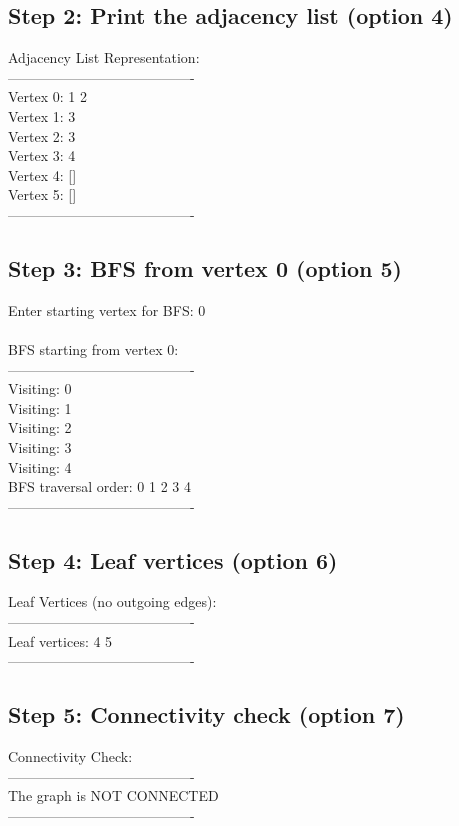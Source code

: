 \documentclass[11pt]{article}
\begin{document}
\subsection*{Step 2: Print the adjacency list (option 4)}
\begin{terminal}
Adjacency List Representation:\\
----------------------------------------\\
Vertex 0: 1 2\\
Vertex 1: 3\\
Vertex 2: 3\\
Vertex 3: 4\\
Vertex 4: []\\
Vertex 5: []\\
----------------------------------------
\end{terminal}

\subsection*{Step 3: BFS from vertex 0 (option 5)}
\begin{terminal}
Enter starting vertex for BFS: 0\\
\ \\
BFS starting from vertex 0:\\
----------------------------------------\\
Visiting: 0\\
Visiting: 1\\
Visiting: 2\\
Visiting: 3\\
Visiting: 4\\
BFS traversal order: 0 1 2 3 4\\
----------------------------------------
\end{terminal}

\subsection*{Step 4: Leaf vertices (option 6)}
\begin{terminal}
Leaf Vertices (no outgoing edges):\\
----------------------------------------\\
Leaf vertices: 4 5\\
----------------------------------------
\end{terminal}

\subsection*{Step 5: Connectivity check (option 7)}
\begin{terminal}
Connectivity Check:\\
----------------------------------------\\
The graph is NOT CONNECTED\\
----------------------------------------
\end{terminal}
\end{document}
